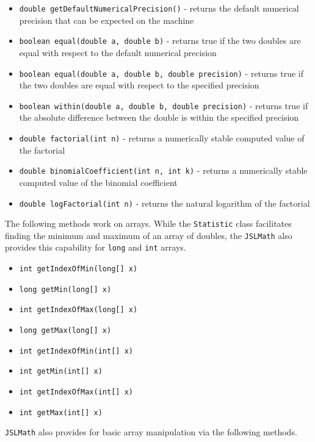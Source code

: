 \documentclass[
]{book}
\providecommand{\tightlist}{%
  \setlength{\itemsep}{0pt}\setlength{\parskip}{0pt}}
\theoremstyle{definition}
\theoremstyle{definition}
\theoremstyle{definition}
\theoremstyle{definition}
\theoremstyle{remark}
\begin{document}
\begin{itemize}
\tightlist
\item
  \texttt{double\ getDefaultNumericalPrecision()} - returns the default numerical precision that can be expected on the machine
\item
  \texttt{boolean\ equal(double\ a,\ double\ b)} - returns true if the two doubles are equal with respect to the default numerical precision
\item
  \texttt{boolean\ equal(double\ a,\ double\ b,\ double\ precision)} - returns true if the two doubles are equal with respect to the specified precision
\item
  \texttt{boolean\ within(double\ a,\ double\ b,\ double\ precision)} - returns true if the absolute difference between the double is within the specified precision
\item
  \texttt{double\ factorial(int\ n)} - returns a numerically stable computed value of the factorial
\item
  \texttt{double\ binomialCoefficient(int\ n,\ int\ k)} - returns a numerically stable computed value of the binomial coefficient
\item
  \texttt{double\ logFactorial(int\ n)} - returns the natural logarithm of the factorial
\end{itemize}

The following methods work on arrays. While the \texttt{Statistic} class facilitates finding the minimum and maximum of an array of doubles, the \texttt{JSLMath} also provides this capability for \texttt{long} and \texttt{int} arrays.

\begin{itemize}
\tightlist
\item
  \texttt{int\ getIndexOfMin(long{[}{]}\ x)}
\item
  \texttt{long\ getMin(long{[}{]}\ x)}
\item
  \texttt{int\ getIndexOfMax(long{[}{]}\ x)}
\item
  \texttt{long\ getMax(long{[}{]}\ x)}
\item
  \texttt{int\ getIndexOfMin(int{[}{]}\ x)}
\item
  \texttt{int\ getMin(int{[}{]}\ x)}
\item
  \texttt{int\ getIndexOfMax(int{[}{]}\ x)}
\item
  \texttt{int\ getMax(int{[}{]}\ x)}
\end{itemize}

\texttt{JSLMath} also provides for basic array manipulation via the following methods.
\end{document}
